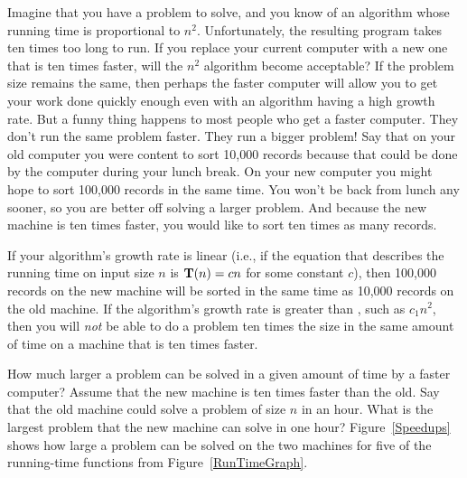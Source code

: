 Imagine that you have a problem to solve, and you know of an algorithm
whose running time is proportional to \(n^2\).
Unfortunately, the resulting program takes ten times too long to run.
If you replace your current computer with a new one that is ten times
faster, will the \(n^2\) algorithm become acceptable?
If the problem size remains the same, then perhaps
the faster computer will allow you to get your work done quickly
enough even with an algorithm having a high growth rate.
But a funny thing happens to most people who get a faster computer.
They don't run the same problem faster.
They run a bigger problem!
Say that on your old computer you were content to sort
10,000 records because that could be done by the computer during your
lunch break.
On your new computer you might hope to sort 100,000
records in the same time.
You won't be back from lunch any sooner, so you are better off solving a
larger problem.
And because the new machine is ten times faster, you would like to
sort ten times as many records.

If your algorithm's growth rate is linear (i.e., if the equation that
describes the running time on input size \(n\) is \(\mbox{$\textbf{T}(n)$} = \mbox{$c n$}\) for some
constant \(c\)),
then 100,000 records on the new machine will be sorted in the same time
as 10,000 records on the old machine.
If the algorithm's growth rate is greater than \cn,
such as \(c_1n^2\), then you will \emph{not} be able to do a
problem ten times the size in the same amount of time on a machine
that is ten times faster.

How much larger a problem can be solved
in a given amount of time by a faster computer?
Assume that the new machine is ten times faster than the old.
Say that the old machine could solve a problem of size \(n\) in an hour.
What is the largest problem that the new machine can solve in one hour?
Figure~\ref{Speedups} shows how large a problem can be solved on
the two machines for five of the running-time functions from
Figure~\ref{RunTimeGraph}.

